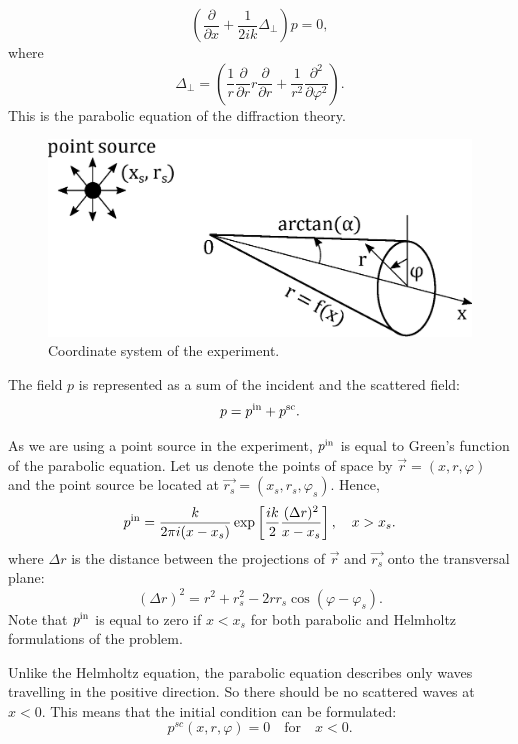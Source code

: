 \documentclass{procDDs}
\begin{document}
\begin{equation}\label{parab_eqn}                     
\left( \frac{\partial}{\partial x} + \frac{1}{2ik} \Delta_\perp \right) p = 0,                                 
\end{equation}
where 
\begin{equation}
\Delta_\perp = \left(\frac{1}{r}\frac{\partial}{\partial r}r\frac{\partial}{\partial r}+\frac{1}{r^2}\frac{\partial^2}{\partial \varphi^2}\right).
\end{equation}
This is the parabolic equation of the diffraction theory.

\begin{figure}[t!]\centering
	\includegraphics[width=.48\textwidth]{cone_pic.eps}
	\caption{Coordinate system of the experiment.}\label{cone_pic}
\end{figure}

The field $p$ is represented as a sum of the incident and the scattered field:
\begin{equation}
p = p^{\rm in} + p^{\rm sc}.
\end{equation}

As we are using a point source in the experiment, $p^{\rm in}$  is equal to Green's function of the parabolic equation. Let us denote the points of space by $\vec{r} = (x, r, \varphi)$ and the point source be located at $\vec{r_s} = (x_s, r_s, \varphi_s)$. Hence, 
\begin{equation}\label{greens_sol}                     
p^{\rm in} = \frac{k}{2\pi i (x-x_s)} \exp \left[   \frac{ik}{2} \frac{(\Delta r)^2}{x-x_s}\right], \quad x>x_s.
\end{equation}
where $\Delta r$ is the distance between the projections of $\vec{r}$ and $\vec{r_s}$ onto the transversal plane:
\begin{equation}\label{delta_r}                     
(\Delta r)^2 = r^2 + r_s^2 - 2r r_s \cos(\varphi - \varphi_s).
\end{equation}
Note that $p^{\rm in}$ is equal to zero if $x < x_s$ for both parabolic and Helmholtz formulations of the problem.

Unlike the Helmholtz equation, the parabolic equation describes only waves travelling in the positive direction. So there should be no scattered waves at $x < 0$. This means that the initial condition can be formulated:
\begin{equation}
p^{sc}(x, r, \varphi) = 0 \quad \textrm{for} \quad x < 0.
\end{equation}
\end{document}
